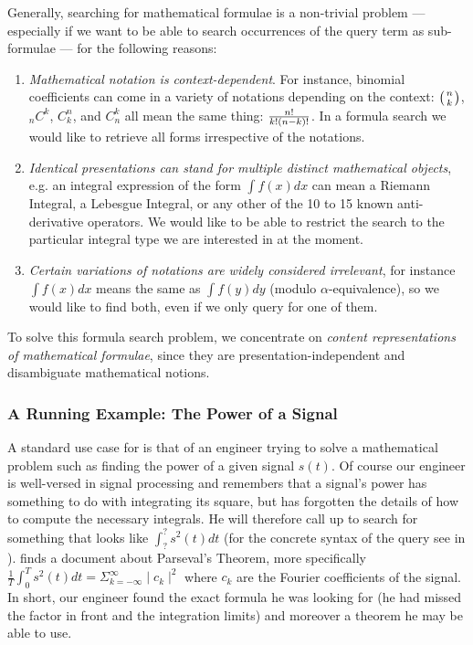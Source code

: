 Generally, searching for mathematical formulae is a non-trivial problem --- especially if
we want to be able to search occurrences of the query term as sub-formulae --- for the
following reasons:
\begin{enumerate}
\item {\emph{Mathematical notation is context-dependent}}. For instance, binomial
  coefficients can come in a variety of notations depending on the context: $\left(n\atop
    k\right)$, $_nC^k$, $C^n_k$, and $C^k_n$ all mean the same thing: $n!\over k!(n-k)!$.
  In a formula search we would like to retrieve all forms irrespective of the notations.
\item {\emph{Identical presentations can stand for multiple distinct mathematical
      objects}}, e.g. an integral expression of the form $\int f(x) dx$ can mean a Riemann
  Integral, a Lebesgue Integral, or any other of the 10 to 15 known anti-derivative
  operators.  We would like to be able to restrict the search to the particular integral
  type we are interested in at the moment.
\item {\emph{Certain variations of notations are widely considered irrelevant}}, for
  instance $\int f(x) dx$ means the same as $\int f(y) dy$ (modulo $\alpha$-equivalence),
  so we would like to find both, even if we only query for one of them.
\end{enumerate}
To solve this formula search problem, we concentrate on {\emph{content representations of
    mathematical formulae}}, since they are presentation-independent and disambiguate
mathematical notions.

\subsubsection{A Running Example: The Power of a Signal}\label{sec:runnex}

A standard use case for {\mmlsearch} is that of an engineer trying to solve a mathematical
problem such as finding the power of a given signal $s(t)$.  Of course our engineer is
well-versed in signal processing and remembers that a signal's power has something to do
with integrating its square, but has forgotten the details of how to compute the necessary
integrals. He will therefore call up {\mmlsearch} to search for something that looks like
$\int_?^?s^2(t)dt$ (for the concrete syntax of the query see {}
in {}). {\mmlsearch} finds a document about Parseval's Theorem, more
specifically $\frac{1}{T}\int_0^Ts^2(t)dt = \Sigma_{k=-\infty}^{\infty}\mid c_k\mid^2$
where $c_k$ are the Fourier coefficients of the signal.  In short, our engineer found the
exact formula he was looking for (he had missed the factor in front and the integration
limits) and moreover a theorem he may be able to use.


